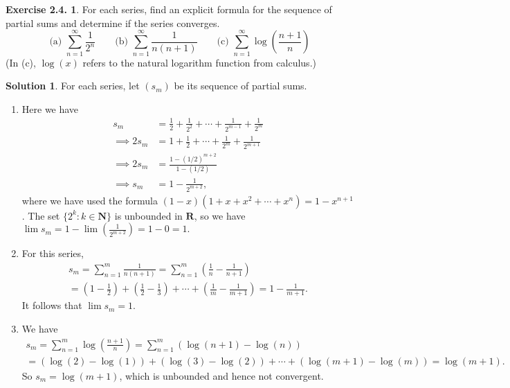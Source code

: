 \documentclass[12pt]{article}
\theoremstyle{definition}
\theoremstyle{exercise}
\newtheorem{exercise}{Exercise 2.4.}
\theoremstyle{solution}
\newtheorem*{solution}{Solution}
\newcommand{\N}{\mathbf{N}}
\newcommand{\R}{\mathbf{R}}
\begin{document}
\begin{exercise}
\label{ex:8}
    For each series, find an explicit formula for the sequence of partial sums and determine if the series converges.
    \[
        \text{(a) } \sum_{n=1}^{\infty} \frac{1}{2^n} \qquad \text{(b) } \sum_{n=1}^{\infty} \frac{1}{n(n+1)} \qquad \text{(c) } \sum_{n=1}^{\infty} \log \left( \frac{n+1}{n} \right)
    \]
    (In (c), \( \log(x) \) refers to the natural logarithm function from calculus.)
\end{exercise}

\begin{solution}
    For each series, let \( (s_m) \) be its sequence of partial sums.
    \begin{enumerate}
        \item Here we have
        \begin{align*}
            s_m &= \frac{1}{2} + \frac{1}{2^2} + \cdots + \frac{1}{2^{m-1}} + \frac{1}{2^m} \\[6pt]
            \implies 2 s_m &= 1 + \frac{1}{2} + \cdots + \frac{1}{2^m} + \frac{1}{2^{m+1}} \\[6pt]
            \implies 2 s_m &= \frac{1 - (1/2)^{m+2}}{1 - (1/2)} \\[6pt]
            \implies s_m &= 1 - \frac{1}{2^{m+2}},
        \end{align*}
        where we have used the formula \( (1 - x)(1 + x + x^2 + \cdots + x^n) = 1 - x^{n+1} \). The set \( \{ 2^k : k \in \N \} \) is unbounded in \( \R \), so we have \( \lim s_m = 1 - \lim \left( \frac{1}{2^{m+2}} \right) = 1 - 0 = 1. \)

        \item For this series,
        \begin{multline*}
            s_m = \sum_{n=1}^m \frac{1}{n(n+1)} = \sum_{n=1}^m \left( \frac{1}{n} - \frac{1}{n+1} \right) \\ = \left( 1 - \frac{1}{2} \right) + \left( \frac{1}{2} - \frac{1}{3} \right) + \cdots + \left( \frac{1}{m} - \frac{1}{m+1} \right) = 1 - \frac{1}{m+1}.
        \end{multline*}
        It follows that \( \lim s_m = 1 \).

        \item We have
        \begin{multline*}
            s_m = \sum_{n=1}^m \log \left( \frac{n+1}{n} \right) = \sum_{n=1}^m (\log(n+1) - \log(n)) \\ = (\log(2) - \log(1)) + (\log(3) - \log(2)) + \cdots + (\log(m+1) - \log(m)) = \log(m+1).
        \end{multline*}
        So \( s_m = \log(m+1) \), which is unbounded and hence not convergent.
    \end{enumerate}
\end{solution}
\end{document}
